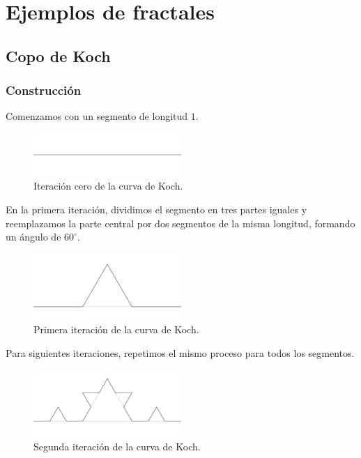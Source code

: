 \chapter{Ejemplos de fractales}

\section{Copo de Koch}

\subsection{Construcción}

\noindent Comenzamos con un segmento de longitud $1$.

\begin{figure}[H]
    \centering
    \includegraphics[width=0.5\textwidth]{figures/kock-curve-iteration-0.png}
    \caption{Iteración cero de la curva de Koch.}
    \label{fig:koch-curve-iteration-0}
\end{figure}

\noindent En la primera iteración, dividimos el segmento en tres partes iguales y reemplazamos la parte central por dos segmentos de la misma longitud, formando un ángulo de $60^\circ$.

\begin{figure}[H]
    \centering
    \includegraphics[width=0.5\textwidth]{figures/kock-curve-iteration-1.png}
    \caption{Primera iteración de la curva de Koch.}
    \label{fig:koch-curve-iteration-1}
\end{figure}

\noindent Para siguientes iteraciones, repetimos el mismo proceso para todos los segmentos.

\begin{figure}[H]
    \centering
    \includegraphics[width=0.5\textwidth]{figures/kock-curve-iteration-2.png}
    \caption{Segunda iteración de la curva de Koch.}
    \label{fig:koch-curve-iteration-2}
\end{figure}

